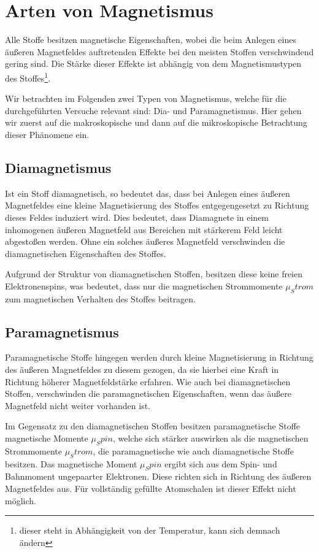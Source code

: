 \documentclass[11pt,a4paper,titlepage, ngerman]{article}
\begin{document}
	\section{Arten von Magnetismus}
				
		Alle Stoffe besitzen magnetische Eigenschaften, wobei die beim Anlegen eines äußeren Magnetfeldes auftretenden Effekte bei den meisten Stoffen verschwindend gering sind. Die \glqq Stärke \grqq dieser Effekte ist abhängig von dem Magnetismustypen des Stoffes\footnote{dieser steht in Abhängigkeit von der Temperatur, kann sich demnach ändern}. 
				
		Wir betrachten im Folgenden zwei Typen von Magnetismus, welche für die durchgeführten Versuche relevant sind: Dia- und Paramagnetismus. Hier gehen wir zuerst auf die makroskopische und dann auf die mikroskopische Betrachtung dieser Phänomene ein.
					
		\subsection{Diamagnetismus}
			
			Ist ein Stoff diamagnetisch, so bedeutet das, dass bei Anlegen eines äußeren Magnetfeldes eine kleine Magnetisierung des Stoffes entgegengesetzt zu Richtung dieses Feldes induziert wird.
			Dies bedeutet, dass Diamagnete in einem inhomogenen äußeren Magnetfeld aus Bereichen mit stärkerem Feld leicht abgestoßen werden. Ohne ein solches äußeres Magnetfeld verschwinden die diamagnetischen Eigenschaften des Stoffes.
			
			Aufgrund der Struktur von diamagnetischen Stoffen, besitzen diese keine freien Elektronenspins, was bedeutet, dass nur die magnetischen Strommomente $\mu _Strom$ zum magnetischen Verhalten des Stoffes beitragen.
						
		\subsection{Paramagnetismus}
			
			Paramagnetische Stoffe hingegen werden durch kleine Magnetisierung in Richtung des äußeren Magnetfeldes zu diesem gezogen, da sie hierbei eine Kraft in Richtung höherer Magnetfeldstärke erfahren. 
			Wie auch bei diamagnetischen Stoffen, verschwinden die paramagnetischen Eigenschaften, wenn das äußere Magnetfeld nicht weiter vorhanden ist.
				
			Im Gegensatz zu den diamagnetischen Stoffen besitzen paramagnetische Stoffe magnetische Momente $\mu _Spin$, welche sich stärker auswirken als die magnetischen Strommomente $\mu _Strom$, die paramagnetische wie auch diamagnetische Stoffe besitzen.
			Das magnetische	Moment $\mu _Spin$ ergibt sich aus dem Spin- und Bahnmoment ungepaarter Elektronen. 
			Diese richten sich in Richtung des äußeren Magnetfeldes aus. Für vollständig gefüllte Atomschalen ist dieser Effekt nicht möglich.			
			
\end{document}
